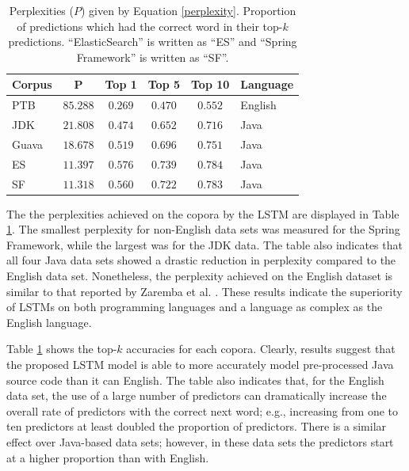 \documentclass[runningheads,a4paper]{llncs}
\newcommand{\tabhorzspacing}{0.5em}
\newcommand{\tabvertspacing}{1.1}
\begin{document}
\begin{table}[t]
    \caption{Perplexities ($P$) given by Equation \ref{perplexity}.
    Proportion of predictions which had the correct
    word in their top-$k$ predictions.
    ``ElasticSearch'' is written as ``ES'' and ``Spring
    Framework'' is written as ``SF''.}
    \label{topk-table}
    \vskip 0.15in
    \begin{center}
    \setlength{\tabcolsep}{\tabhorzspacing}
    {\renewcommand{\arraystretch}{\tabvertspacing}
    \begin{tabular}{lccccl}
    \hline
    Corpus & P & Top 1 & Top 5 & Top 10 & Language \\
    \hline
    PTB   & $85.288$ & $0.269$ & $0.470$ & $0.552$ & English \\
    JDK   & $21.808$ & $0.474$ & $0.652$ & $0.716$ & Java \\
    Guava & $18.678$ & $0.519$ & $0.696$ & $0.751$ & Java \\
    ES    & $11.397$ & $0.576$ & $0.739$ & $0.784$ & Java \\
    SF    & $11.318$ & $0.560$ & $0.722$ & $0.783$ & Java \\
    \hline
    \end{tabular}}
    \end{center}
    \vskip -0.1in
\end{table}

The the perplexities achieved on the copora by the LSTM are displayed in
Table \ref{topk-table}. The smallest perplexity for non-English data sets 
was measured for the Spring Framework, while the largest was for the JDK data. 
The table also indicates that all four Java data sets showed a drastic 
reduction in perplexity compared to the English data set. Nonetheless, the 
perplexity achieved on the English dataset is similar to that reported by 
Zaremba et al. \cite{Zaremba}. These results indicate the superiority of LSTMs on both
programming languages and a language as complex as the English language.

Table \ref{topk-table} shows the top-$k$ accuracies for each copora.
Clearly, results suggest that the proposed LSTM model is able to more
accurately model pre-processed Java source code than it can English. The table
also indicates that, for the English data set, the use of a large number of
predictors can dramatically increase the overall rate of predictors with the
correct next word; e.g., increasing from one to ten predictors at least doubled
the proportion of predictors. There is a similar effect over Java-based data
sets; however, in these data sets the predictors start at a higher proportion
than with English.
\end{document}
